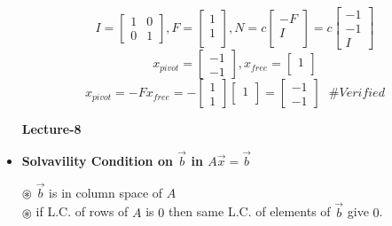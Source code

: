 \documentclass[a4paper,11pt]{article}
\numberwithin{equation}{section}
\begin{document}
\begin{itemize}
\begin{center}
\[        I=\begin{bmatrix}
            1&0\\0&1
        \end{bmatrix},F=
        \begin{bmatrix}
            1\\1\\
        \end{bmatrix},N=c
        \begin{bmatrix}
            -F\\I\\
        \end{bmatrix}=c
        \begin{bmatrix}
            -1\\-1\\I
        \end{bmatrix}
    \]
    \[
        x_{pivot}=
        \begin{bmatrix}
            -1\\-1
        \end{bmatrix},
        x_{free}=
        \begin{bmatrix}
            1\\
        \end{bmatrix}
    \]
    \[
        x_{pivot}=-Fx_{free}=-
        \begin{bmatrix}
            1\\1
        \end{bmatrix}
        \begin{bmatrix}
            1\\
        \end{bmatrix}=
        \begin{bmatrix}
            -1\\-1 
        \end{bmatrix} \hspace{8pt}\# Verified
    \]
\end{center}


\begin{center}
    \Huge{\textbf{Lecture-8}}
\end{center}
\vspace{5pt}
\item \textbf{Solvavility Condition on $\vec{b}$ in $A\vec{x}=\vec{b}$}

\textbf{$\circledast$ } $\vec{b}$ is in column space of $A$\\
\textbf{$\circledast$ } if L.C. of rows of $A$ is $0$ then same L.C. of elements of $\vec{b}$ give $0$.


\end{itemize}
\end{document}
